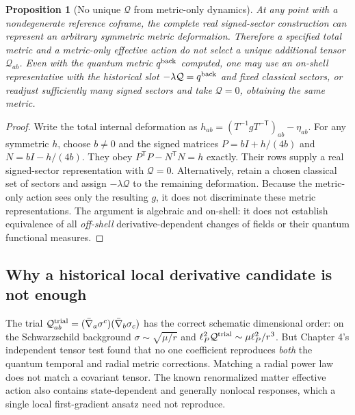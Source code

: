 \documentclass[11pt,a4paper]{article}
\newtheorem{proposition}[theorem]{Proposition}
\begin{document}
\begin{proposition}[No unique $\mathcal Q$ from metric-only dynamics]\label{prop:qgd138-nounique}
At any point with a nondegenerate reference coframe, the complete real
signed-sector construction can represent an arbitrary symmetric metric
deformation. Therefore a specified total metric and a metric-only
effective action do not select a unique additional tensor
$\mathcal Q_{ab}$. Even with the quantum metric $q^{\rm back}$ computed,
one may use an on-shell representative with the historical slot
$-\lambda\mathcal Q=q^{\rm back}$ and fixed classical sectors,
\emph{or} readjust sufficiently many signed sectors and take
$\mathcal Q=0$, obtaining the same metric.
\end{proposition}
\begin{proof}
Write the total internal deformation as
$h_{ab}=(T^{-1}gT^{-\mathsf T})_{ab}-\eta_{ab}$.
For any symmetric $h$, choose $b\ne0$ and the signed matrices
$P=bI+h/(4b)$ and $N=bI-h/(4b)$. They obey
$P^{\mathsf T}P-N^{\mathsf T}N=h$ exactly. Their rows supply a
real signed-sector representation with $\mathcal Q=0$.
Alternatively, retain a chosen classical set of sectors and assign
$-\lambda\mathcal Q$ to the remaining deformation. Because the
metric-only action sees only the resulting $g$, it does not
discriminate these metric representations. The argument is
algebraic and on-shell: it does not establish equivalence of all
\emph{off-shell} derivative-dependent changes of fields or their
quantum functional measures.
\end{proof}

\subsection{Why a historical local derivative candidate is not enough}
The trial $\mathcal Q_{ab}^{\rm trial}=
(\bar\nabla_a\sigma^c)(\bar\nabla_b\sigma_c)$
has the correct schematic dimensional order: on the Schwarzschild
background $\sigma\sim\sqrt{\mu/r}$ and
$\ell_P^2\mathcal Q^{\rm trial}\sim\mu\ell_P^2/r^3$.
But Chapter 4's independent tensor test found that no one coefficient
reproduces \emph{both} the quantum temporal and radial metric corrections.
Matching a radial power law does not match a covariant tensor.
The known renormalized matter effective action also contains
state-dependent and generally nonlocal responses, which a single
local first-gradient ansatz need not reproduce.
\end{document}
